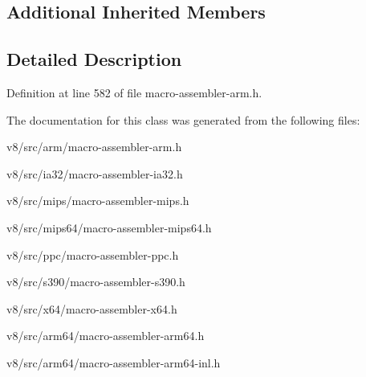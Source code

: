 \subsection*{Additional Inherited Members}


\subsection{Detailed Description}


Definition at line 582 of file macro-\/assembler-\/arm.\+h.



The documentation for this class was generated from the following files\+:\begin{DoxyCompactItemize}
\item 
v8/src/arm/macro-\/assembler-\/arm.\+h\item 
v8/src/ia32/macro-\/assembler-\/ia32.\+h\item 
v8/src/mips/macro-\/assembler-\/mips.\+h\item 
v8/src/mips64/macro-\/assembler-\/mips64.\+h\item 
v8/src/ppc/macro-\/assembler-\/ppc.\+h\item 
v8/src/s390/macro-\/assembler-\/s390.\+h\item 
v8/src/x64/macro-\/assembler-\/x64.\+h\item 
v8/src/arm64/macro-\/assembler-\/arm64.\+h\item 
v8/src/arm64/macro-\/assembler-\/arm64-\/inl.\+h\end{DoxyCompactItemize}
